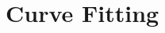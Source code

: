 \documentclass[../computational_physics.tex]{subfiles}
\begin{document}
    \section{Curve Fitting}
        


\end{document}
